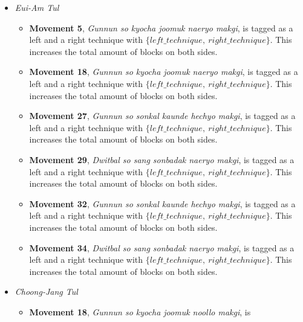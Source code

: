 \documentclass[10pt,twocolumn,a4paper]{article}
\begin{document}
\begin{itemize}
  \item
    \emph{Eui-Am Tul}
    \begin{itemize}
      \item
        {\bf Movement 5}, \emph{Gunnun so kyocha joomuk naeryo makgi}, is
        tagged as a left and a right technique with $\{left\_technique, \:
        right\_technique\}$. This increases the total amount of blocks on both
        sides.
      \item
        {\bf Movement 18}, \emph{Gunnun so kyocha joomuk naeryo makgi}, is
        tagged as a left and a right technique with $\{left\_technique, \:
        right\_technique\}$. This increases the total amount of blocks on both
        sides.
      \item
        {\bf Movement 27}, \emph{Gunnun so sonkal kaunde hechyo makgi}, is
        tagged as a left and a right technique with $\{left\_technique, \:
        right\_technique\}$. This increases the total amount of blocks on both
        sides.
      \item
        {\bf Movement 29}, \emph{Dwitbal so sang sonbadak naeryo makgi}, is
        tagged as a left and a right technique with $\{left\_technique, \:
        right\_technique\}$. This increases the total amount of blocks on both
        sides.
      \item
        {\bf Movement 32}, \emph{Gunnun so sonkal kaunde hechyo makgi}, is
        tagged as a left and a right technique with $\{left\_technique, \:
        right\_technique\}$. This increases the total amount of blocks on both
        sides.
      \item
        {\bf Movement 34}, \emph{Dwitbal so sang sonbadak naeryo makgi}, is
        tagged as a left and a right technique with $\{left\_technique, \:
        right\_technique\}$. This increases the total amount of blocks on both
        sides.
    \end{itemize}
  \item
    \emph{Choong-Jang Tul}
    \begin{itemize}
      \item
        {\bf Movement 18}, \emph{Gunnun so kyocha joomuk noollo makgi}, is

\end{itemize}
\end{itemize}
\end{document}
